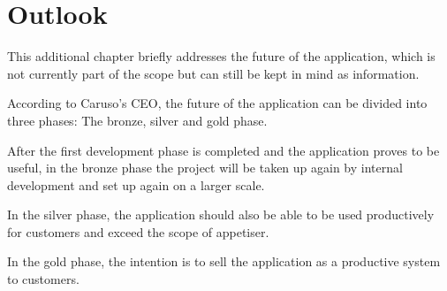 \chapter{Outlook}
This additional chapter briefly addresses the future of the application, which is not currently part of the scope but can still be kept in mind as information.

According to Caruso's CEO, the future of the application can be divided into three phases: The bronze, silver and gold phase.

After the first development phase is completed and the application proves to be useful, in the bronze phase the project will be taken up again by internal development and set up again on a larger scale.

In the silver phase, the application should also be able to be used productively for customers and exceed the scope of \gls{appetiser}.

In the gold phase, the intention is to sell the application as a productive system to customers.
